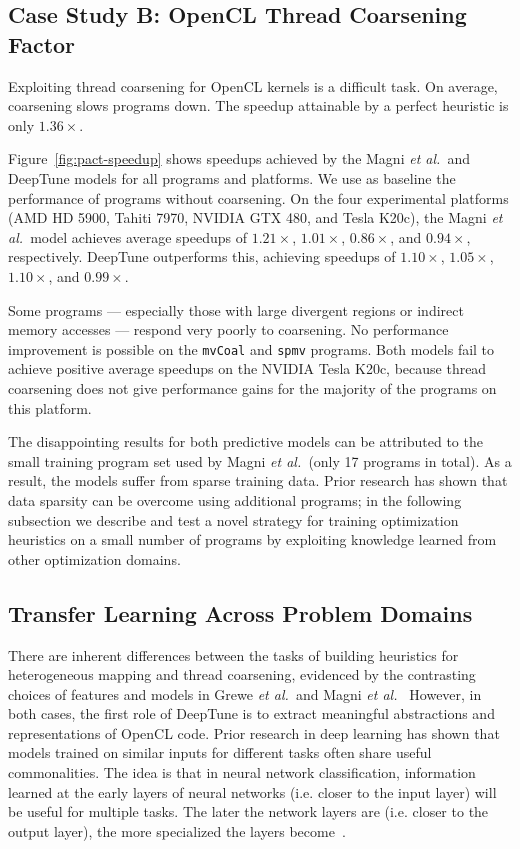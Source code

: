 



\subsection{Case Study B: OpenCL Thread Coarsening Factor}



Exploiting thread coarsening for OpenCL kernels is a difficult task. On average, coarsening slows programs down. The speedup attainable by a perfect heuristic is only $1.36\times$.

Figure~\ref{fig:pact-speedup} shows speedups achieved by the Magni \emph{et al.\ }and DeepTune models for all programs and platforms. We use as baseline the performance of programs without coarsening. On the four experimental platforms (AMD HD 5900, Tahiti 7970, NVIDIA GTX 480, and Tesla K20c), the Magni \emph{et al.\ }model achieves average speedups of $1.21\times$, $1.01\times$, $0.86\times$, and $0.94\times$, respectively. DeepTune outperforms this, achieving speedups of $1.10\times$, $1.05\times$, $1.10\times$, and $0.99\times$.

Some programs --- especially those with large divergent regions or indirect memory accesses --- respond very poorly to coarsening. No performance improvement is possible on the \texttt{mvCoal} and \texttt{spmv} programs. Both models fail to achieve positive average speedups on the NVIDIA Tesla K20c, because thread coarsening does not give performance gains for the majority of the programs on this platform.

The disappointing results for both predictive models can be attributed to the small training program set used by Magni \emph{et al.\ }(only 17 programs in total). As a result, the models suffer from sparse training data. Prior research has shown that data sparsity can be overcome using additional programs; in the following subsection we describe and test a novel strategy for training optimization heuristics on a small number of programs by exploiting knowledge learned from other optimization domains.


\subsection{Transfer Learning Across Problem Domains}\label{subsec:tl}

There are inherent differences between the tasks of building heuristics for heterogeneous mapping and thread coarsening, evidenced by the contrasting choices of features and models in Grewe \emph{et al.\ }and Magni \emph{et al.\ } However, in both cases, the first role of DeepTune is to extract meaningful abstractions and representations of OpenCL code. Prior research in deep learning has shown that models trained on similar inputs for different tasks often share useful commonalities. The idea is that in neural network classification, information learned at the early layers of neural networks (i.e. closer to the input layer) will be useful for multiple tasks. The later the network layers are (i.e. closer to the output layer), the more specialized the layers become~\cite{Zeiler2014}.

